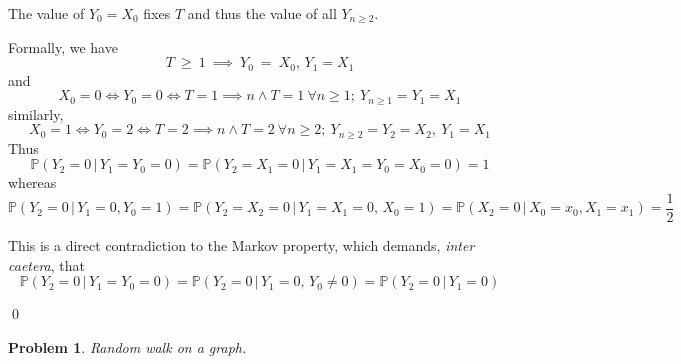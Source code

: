 \documentclass[8pt,notitlepage]{report}
\newtheorem{problem}{Problem}
\newenvironment{solution}[1][Solution]{\begin{trivlist}
    \item[\hskip \labelsep {\bfseries #1}]}{\end{trivlist}}
\newcommand{\PP}{\mathbb{P}}
\begin{document}
\begin{solution}

The value of $Y_0 = X_0$ fixes $T$ and thus the value of all $Y_{n \geq 2}$.


Formally, we have
$$
 T~\ge~1~\implies~Y_0~=~X_0,\, Y_1 = X_1
$$
and 
\small
$$
 X_0 = 0 \iff Y_0 = 0 \iff T=1 \implies n \wedge T = 1 \  \forall n \geq 1 ;\   Y_{n\geq 1} = Y_1 = X_1
$$
\normalsize
similarly,
\small
$$
 X_0 = 1 \iff Y_0 = 2 \iff T=2 \implies n \wedge T = 2 \  \forall n \geq 2 ;\  Y_{n\geq 2} = Y_2 = X_2,\ Y_1 = X_1
$$
\normalsize
Thus
$$
\PP(Y_2=0\,|\,Y_1=Y_0=0) = \PP(Y_2=X_1=0\,|\,Y_1=X_1=Y_0=X_0=0) = 1
$$
whereas
\small
$$
\PP(Y_2=0\,|\,Y_1=0,Y_0=1) = \PP(Y_2=X_2=0\,|\,Y_1=X_1=0,\,X_0=1) = \PP(X_2=0\,|\,X_0=x_0,X_1=x_1) = \frac{1}{2}
$$
\normalsize

This is a direct contradiction to the Markov property, which demands, {\it inter caetera}, that
$$
 \PP(Y_2=0\, |\, Y_1=Y_0=0 ) = \PP(Y_2=0\,|\, Y_1=0,\,Y_0\neq0) = \PP(Y_2=0\,|\,Y_1=0)
$$

\qed
\end{solution}


\begin{problem} Random walk on a graph.

\end{problem}
\end{document}
